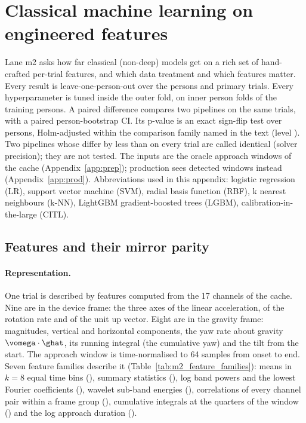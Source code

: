 \section{Classical machine learning on engineered features}\label{app:m2}

Lane m2 asks how far classical (non-deep) models get on a rich set of hand-crafted per-trial features, and
which data treatment and which features matter. Every result is leave-one-person-out over the
 persons and  primary trials. Every hyperparameter is tuned
inside the outer fold, on  inner person folds of the training persons. A paired difference
compares two pipelines on the same trials, with a paired person-bootstrap CI. Its p-value is an exact sign-flip
test over persons, Holm-adjusted within the comparison family named in the text (level ). Two
pipelines whose \pright{} differ by less than  on every trial are called identical (solver
precision); they are not tested. The inputs are the oracle approach windows of the cache
(Appendix~\ref{app:prep}); production sees detected windows instead (Appendix~\ref{app:prod}).
Abbreviations used in this appendix: logistic regression (LR), support vector machine (SVM), radial basis
function (RBF), k nearest neighbours (k-NN), LightGBM gradient-boosted trees (LGBM), calibration-in-the-large
(CITL).

\subsection{Features and their mirror parity}\label{app:m2:features}

\paragraph{Representation.} One trial is described by  features computed from the
17 channels of the cache. Nine are in the device frame: the three axes of the linear acceleration, of the
rotation rate and of the unit up vector. Eight are in the gravity frame: magnitudes, vertical and horizontal
components, the yaw rate about gravity $\vomega\cdot\ghat$, its running integral (the cumulative yaw) and the
tilt from the start. The approach window is time-normalised to 64 samples from onset to end. Seven feature
families describe it (Table~\ref{tab:m2_feature_families}): means in $k = 8$ equal time bins (),
summary statistics (), log band powers and the lowest Fourier coefficients (), wavelet
sub-band energies (), correlations of every channel pair within a frame group (),
cumulative integrals at the quarters of the window () and the log approach duration
().

